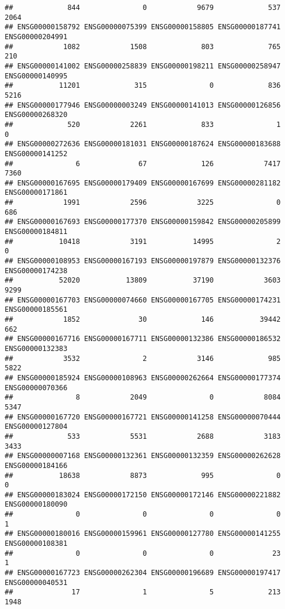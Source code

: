 \documentclass[
]{article}
\begin{document}
\begin{verbatim}
##             844               0            9679             537            2064 
## ENSG00000158792 ENSG00000075399 ENSG00000158805 ENSG00000187741 ENSG00000204991 
##            1082            1508             803             765             210 
## ENSG00000141002 ENSG00000258839 ENSG00000198211 ENSG00000258947 ENSG00000140995 
##           11201             315               0             836            5216 
## ENSG00000177946 ENSG00000003249 ENSG00000141013 ENSG00000126856 ENSG00000268320 
##             520            2261             833               1               0 
## ENSG00000272636 ENSG00000181031 ENSG00000187624 ENSG00000183688 ENSG00000141252 
##               6              67             126            7417            7360 
## ENSG00000167695 ENSG00000179409 ENSG00000167699 ENSG00000281182 ENSG00000171861 
##            1991            2596            3225               0             686 
## ENSG00000167693 ENSG00000177370 ENSG00000159842 ENSG00000205899 ENSG00000184811 
##           10418            3191           14995               2               0 
## ENSG00000108953 ENSG00000167193 ENSG00000197879 ENSG00000132376 ENSG00000174238 
##           52020           13809           37190            3603            9299 
## ENSG00000167703 ENSG00000074660 ENSG00000167705 ENSG00000174231 ENSG00000185561 
##            1852              30             146           39442             662 
## ENSG00000167716 ENSG00000167711 ENSG00000132386 ENSG00000186532 ENSG00000132383 
##            3532               2            3146             985            5822 
## ENSG00000185924 ENSG00000108963 ENSG00000262664 ENSG00000177374 ENSG00000070366 
##               8            2049               0            8084            5347 
## ENSG00000167720 ENSG00000167721 ENSG00000141258 ENSG00000070444 ENSG00000127804 
##             533            5531            2688            3183            3433 
## ENSG00000007168 ENSG00000132361 ENSG00000132359 ENSG00000262628 ENSG00000184166 
##           18638            8873             995               0               0 
## ENSG00000183024 ENSG00000172150 ENSG00000172146 ENSG00000221882 ENSG00000180090 
##               0               0               0               0               1 
## ENSG00000180016 ENSG00000159961 ENSG00000127780 ENSG00000141255 ENSG00000108381 
##               0               0               0              23               1 
## ENSG00000167723 ENSG00000262304 ENSG00000196689 ENSG00000197417 ENSG00000040531 
##              17               1               5             213            1948 

\end{verbatim}
\end{document}
